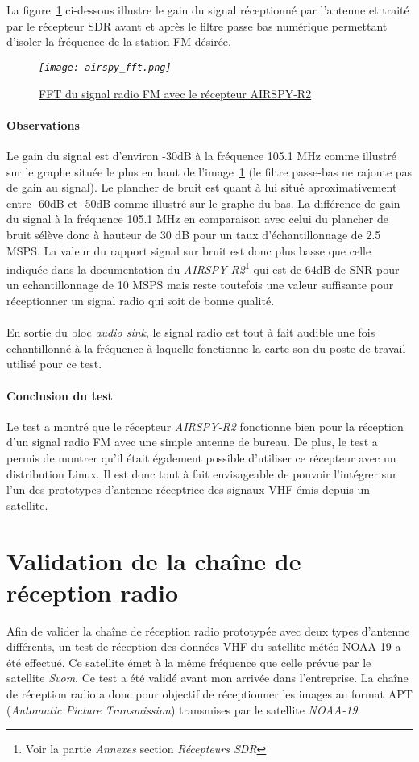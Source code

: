 \documentclass[12pt,fleqn]{book} %
\begin{document}
~\\\\La figure~\underline{\color{blue}\ref{airspy_fft}} ci-dessous illustre le gain du signal réceptionné par l'antenne et traité par le récepteur SDR avant et après le filtre passe bas numérique permettant d'isoler la fréquence de la station FM désirée.
\begin{figure}[H]
	\centering
	\itshape
	\texttt{[image: airspy\_fft.png]}
	\caption{\label{airspy_fft} \underline{FFT du signal radio FM avec le récepteur AIRSPY-R2}}
\end{figure}
\subsubsection{Observations}
Le gain du signal est d'environ -30dB à la fréquence 105.1 MHz comme illustré sur le graphe située le plus en haut de l'image~\underline{\color{blue}\ref{airspy_fft}} (le filtre passe-bas ne rajoute pas de gain au signal). Le plancher de bruit est quant à lui situé aproximativement entre -60dB et -50dB comme illustré sur le graphe du bas. La différence de gain du signal à la fréquence 105.1 MHz en comparaison avec celui du plancher de bruit sélève donc à hauteur de 30 dB pour un taux d'échantillonnage de 2.5 MSPS.
La valeur du rapport signal sur bruit est donc plus basse que celle indiquée dans la documentation du \emph{AIRSPY-R2}\footnote{Voir la partie \emph{Annexes} section \emph{Récepteurs SDR}} qui est de 64dB de SNR pour un echantillonnage de 10 MSPS mais reste toutefois une valeur suffisante pour réceptionner un signal radio qui soit de bonne qualité.
~\\\\En sortie du bloc \emph{audio sink}, le signal radio est tout à fait audible une fois echantillonné à la fréquence à laquelle fonctionne la carte son du poste de travail utilisé pour ce test.
\subsubsection{Conclusion du test}
Le test a montré que le récepteur \emph{AIRSPY-R2} fonctionne bien pour la réception d'un signal radio FM avec une simple antenne de bureau. De plus, le test a permis de montrer qu'il était également possible d'utiliser ce récepteur avec un distribution Linux.
Il est donc tout à fait envisageable de pouvoir l'intégrer sur l'un des prototypes d'antenne réceptrice des signaux VHF émis depuis un satellite.

\chapter{Validation de la chaîne de réception radio}
Afin de valider la chaîne de réception radio prototypée avec deux types d'antenne différents, un test de réception des données VHF du satellite météo NOAA-19 a été effectué. Ce satellite émet à la même fréquence que celle prévue par le satellite \emph{Svom}. Ce test a été validé avant mon arrivée dans l'entreprise.
La chaîne de réception radio a donc pour objectif de réceptionner les images au format APT (\emph{Automatic Picture Transmission}) transmises par le satellite \emph{NOAA-19}.
\end{document}
